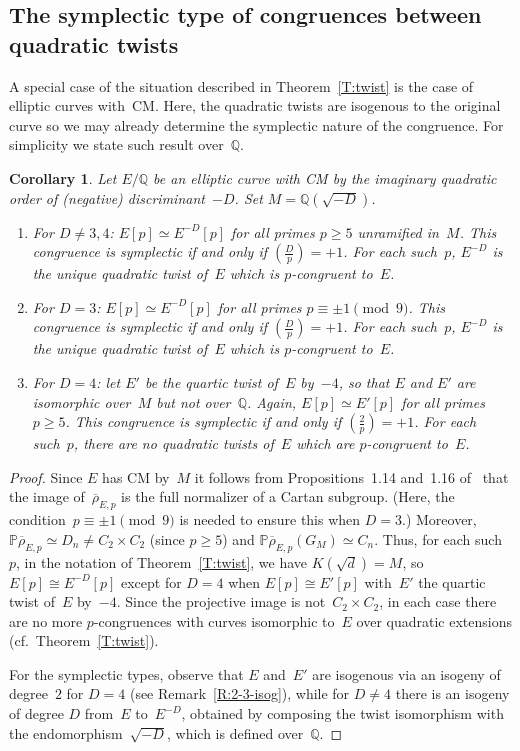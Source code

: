 \documentclass[twoside,leqno,symbols-for-thanks, draft]{rmi}
\numberwithin{equation}{section}
\newcommand{\PP}{\mathbb{P}}
\newcommand{\Q}{\mathbb{Q}}
\newcommand{\rhobar}{{\overline{\rho}}}
\def\legendre#1#2{\left(\displaystyle\frac{#1}{#2}\right)}
\newtheorem{corollary}[theorem]{Corollary}
\theoremstyle{remark}
\begin{document}
\subsection{The symplectic type of congruences between quadratic twists}
\label{SS:typeQuadratic}
A special case of the situation described 
in Theorem~\ref{T:twist} is the case
of elliptic curves with~CM.  Here, the quadratic twists are isogenous
to the original curve so we may already determine the symplectic nature
of the congruence.  For simplicity we state such result over~$\Q$.

\begin{corollary}\label{C:CM-twist}
  Let $E/\Q$ be an elliptic curve with CM by the imaginary quadratic
  order of (negative) discriminant~$-D$.  Set $M=\Q(\sqrt{-D})$.

  \begin{enumerate}
  \item
    For $D\not=3,4$: $E[p] \simeq E^{-D}[p]$ for all primes $p \geq 5$
    unramified in~$M$.  This congruence
    is symplectic if and only if $\legendre{D}{p}=+1$.  For each
    such~$p$, $E^{-D}$ is the unique quadratic twist of~$E$
    which is $p$-congruent to~$E$.

  \item
    For $D=3$: $E[p] \simeq E^{-D}[p]$ for all primes $p
    \equiv\pm1\pmod{9}$.  This congruence is
    symplectic if and only if $\legendre{D}{p}=+1$.  For each
    such~$p$, $E^{-D}$ is the unique quadratic twist of~$E$ which is
    $p$-congruent to~$E$.

  \item
    For $D=4$: let $E'$ be the quartic twist of~$E$ by~$-4$, so that
    $E$ and $E'$ are isomorphic over~$M$ but not over~$\Q$.  Again,
    $E[p] \simeq E'[p]$ for all primes $p \geq 5$.  This congruence is
    symplectic if and only if $\legendre{2}{p}=+1$.  For each
    such~$p$, there are no quadratic twists of~$E$ which are
    $p$-congruent to~$E$.
  \end{enumerate}
\end{corollary}
\begin{proof}
Since $E$ has CM by~$M$ it follows from Propositions~1.14
  and~1.16 of~\cite{Zywina} that the image of~$\rhobar_{E,p}$ is the full
normalizer of a Cartan subgroup.  (Here, the
condition~$p\equiv\pm1\pmod{9}$ is needed to ensure this when $D=3$.)
Moreover, $\PP \rhobar_{E,p} \simeq D_n \neq C_2 \times C_2$ (since $p
\geq 5$) and $\PP \rhobar_{E,p}(G_M) \simeq C_n$. Thus, for each
such~$p$, in the notation of Theorem~\ref{T:twist}, we have
$K(\sqrt{d})=M$, so $E[p]\cong E^{-D}[p]$ except for $D=4$ when
$E[p]\cong E'[p]$ with~$E'$ the quartic twist of~$E$ by~$-4$.  Since
the projective image is not~$C_2\times C_2$, in each case there are no
more $p$-congruences with curves isomorphic to~$E$ over quadratic
extensions (cf.~Theorem~\ref{T:twist}).

For the symplectic types, observe that $E$ and~$E'$ are isogenous via
an isogeny of degree~$2$ for $D=4$ (see Remark~\ref{R:2-3-isog}), while
for $D\not=4$ there is an isogeny of degree $D$ from~$E$ to~$E^{-D}$,
obtained by composing the twist isomorphism with the
endomorphism~$\sqrt{-D}$, which is defined over~$\Q$.
\end{proof}
\end{document}
